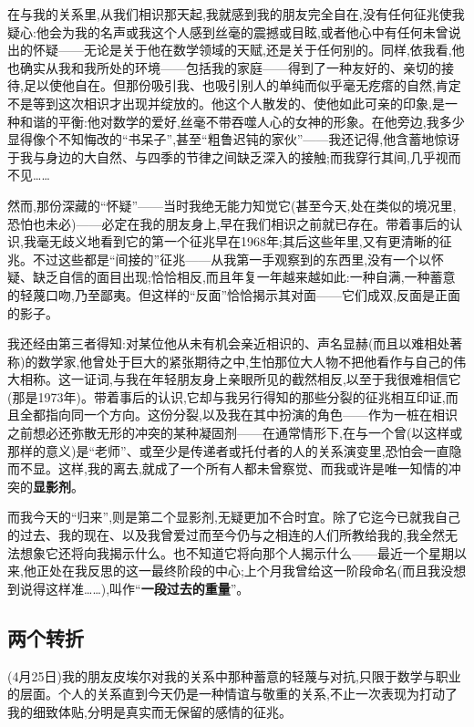 在与我的关系里,从我们相识那天起,我就感到我的朋友完全自在,没有任何征兆使我疑心:他会为我的名声或我这个人感到丝毫的震撼或目眩,或者他心中有任何未曾说出的怀疑——无论是关于他在数学领域的天赋,还是关于任何别的。同样,依我看,他也确实从我和我所处的环境——包括我的家庭——得到了一种友好的、亲切的接待,足以使他自在。但那份吸引我、也吸引别人的单纯而似乎毫无疙瘩的自然,肯定不是等到这次相识才出现并绽放的。他这个人散发的、使他如此可亲的印象,是一种和谐的平衡:他对数学的爱好,丝毫不带吞噬人心的女神的形象。在他旁边,我多少显得像个不知悔改的“书呆子”,甚至“粗鲁迟钝的家伙”——我还记得,他含蓄地惊讶于我与身边的大自然、与四季的节律之间缺乏深入的接触;而我穿行其间,几乎视而不见……

然而,那份深藏的“怀疑”——当时我绝无能力知觉它(甚至今天,处在类似的境况里,恐怕也未必)——必定在我的朋友身上,早在我们相识之前就已存在。带着事后的认识,我毫无歧义地看到它的第一个征兆早在1968年;其后这些年里,又有更清晰的征兆。不过这些都是“间接的”征兆——从我第一手观察到的东西里,没有一个以怀疑、缺乏自信的面目出现;恰恰相反,而且年复一年越来越如此:一种自满,一种\dmark{}蓄意的轻蔑口吻,乃至鄙夷。但这样的“反面”恰恰揭示其对面——它们成双,反面是正面的影子。

我还经由第三者得知:对某位他从未有机会亲近相识的、声名显赫(而且以难相处著称)的数学家,他曾处于巨大的紧张期待之中,生怕那位大人物不把他看作与自己的伟大相称。这一证词,与我在年轻朋友身上亲眼所见的截然相反,以至于我很难相信它(那是1973年)。带着事后的认识,它却与我另行得知的那些分裂的征兆相互印证,而且全都指向同一个方向。这份分裂,以及我在其中扮演的角色——作为一桩在相识之前想必还弥散无形的冲突的某种凝固剂——在通常情形下,在与一个曾(以这样或那样的意义)是“老师”、或至少是传递者或托付者的人的关系演变里,恐怕会一直隐而不显。这样,我的离去,就成了一个所有人都未曾察觉、而我或许是唯一知情的冲突的\textbf{显影剂}。

而我今天的“归来”,则是第二个显影剂,无疑更加不合时宜。除了它迄今已就我自己的过去、我的现在、以及我曾爱过而至今仍与之相连的人们所教给我的,我全然无法想象它还将向我揭示什么。也不知道它将向那个人揭示什么——最近一个星期以来,他正处在我反思的这一最终阶段的中心;上个月我曾给这一阶段命名(而且我没想到说得这样准……),叫作“\textbf{一段过去的重量}”。

\subsection{两个转折}


(4月25日)我的朋友皮埃尔对我的关系中那种蓄意的轻蔑与对抗,只限于数学与职业的层面。个人的关系直到今天仍是一种情谊与敬重的关系,不止一次表现为打动了我的细致体贴,分明是真实而无保留的感情的征兆。

